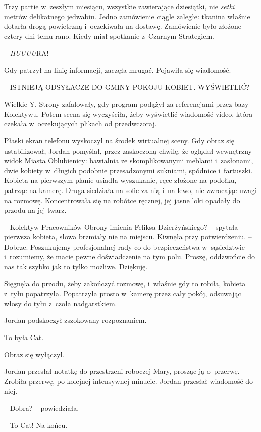 \documentclass[oneside,polish,11pt,sfheadings]{mwbk}
\begin{document}
Trzy partie w~zeszłym miesiącu, wszystkie zawierające dziesiątki, nie
\emph{setki} metrów delikatnego jedwabiu. Jedno zamówienie ciągle
zaległe: tkanina właśnie dotarła drogą powietrzną i~oczekiwała na
dostawę. Zamówienie było złożone cztery dni temu rano. Kiedy miał
spotkanie z~Czarnym Strategiem.

-- \emph{HUUUU}RA!

Gdy patrzył na linię informacji, zaczęła mrugać. Pojawiła się wiadomość.

-- ISTNIEJĄ ODSYŁACZE DO GMINY POKOJU KOBIET. WYŚWIETLIĆ?

Wielkie Y. Strony zafalowały, gdy program podążył za referencjami przez
bazy Kolektywu. Potem scena się wyczyściła, żeby wyświetlić wiadomość
video, która czekała w~oczekujących plikach od przedwczoraj.

Płaski ekran telefonu wyskoczył na środek wirtualnej sceny. Gdy obraz
się ustabilizował, Jordan pomyślał, przez zaskoczoną chwilę, że oglądał
wewnętrzny widok Miasta Oblubienicy: bawialnia ze skomplikowanymi
meblami i~zasłonami, dwie kobiety w~długich podobnie przesadzonymi
sukniami, spódnice i~fartuszki. Kobieta na pierwszym planie usiadła
wyszukanie, ręce złożone na podołku, patrząc na kamerę. Druga siedziała
na sofie za nią i~na lewo, nie zwracając uwagi na rozmowę. Koncentrowała
się na robótce ręcznej, jej jasne loki opadały do przodu na jej twarz.

-- Kolektyw Pracowników Obrony imienia Feliksa Dzierżyńskiego? -- spytała
pierwsza kobieta, słowa brzmiały nie na miejscu. Kiwnęła przy
potwierdzeniu. -- Dobrze. Poszukujemy profesjonalnej rady co do
bezpieczeństwa w~sąsiedztwie i~rozumiemy, że macie pewne doświadczenie
na tym polu. Proszę, oddzwońcie do nas tak szybko jak to tylko możliwe.
Dziękuję.

Sięgnęła do przodu, żeby zakończyć rozmowę, i~właśnie gdy to robiła,
kobieta z~tyłu popatrzyła. Popatrzyła prosto w~kamerę przez cały pokój,
odsuwając włosy do tyłu z~czoła nadgarstkiem.

Jordan podskoczył zszokowany rozpoznaniem.

To była Cat.

Obraz się wyłączył.

Jordan przesłał notatkę do przestrzeni roboczej Mary, prosząc ją o~przerwę. Zrobiła przerwę, po kolejnej intensywnej minucie. Jordan
przesłał wiadomość do niej.

-- Dobra? -- powiedziała.

-- To Cat! Na końcu.
\end{document}
